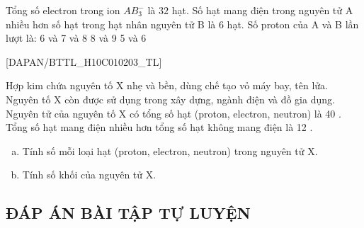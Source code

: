 \begin{ex}[3]
	Tổng số electron trong ion $ AB_{3}^{-} $ là $ 32 $ hạt. Số hạt mang điện trong nguyên tử A nhiều hơn số hạt trong hạt nhân nguyên tử B là 6 hạt. Số proton của A và B lần lượt là:
	\choice
	{%
		6 và 7
	}
	{%
	 và 8
	}
	{%
		8 và 9
	}
	{%
		5 và 6
	}
\end{ex}
[DAPAN/BTTL_H10C010203_TL]
\begin{btex}
	Hợp kim chứa nguyên tố $\mathrm{X}$ nhẹ và bền, dùng chế tạo vỏ máy bay, tên lửa. Nguyên tố $\mathrm{X}$ còn được sử dụng trong xây dựng, ngành điện và đồ gia dụng. Nguyên tử của nguyên tố $\mathrm{X}$ có tổng số hạt (proton, electron, neutron) là 40 . Tổng số hạt mang điện nhiều hơn tổng số hạt không mang điện là 12 .
\begin{enumerate}[a)]
\item Tính số mỗi loại hạt (proton, electron, neutron) trong nguyên tử $\mathrm{X}$.
\item Tính số khối của nguyên tử $\mathrm{X}$.
\end{enumerate}
\end{btex}

\newpage
\subsection{ĐÁP ÁN BÀI TẬP TỰ LUYỆN}



